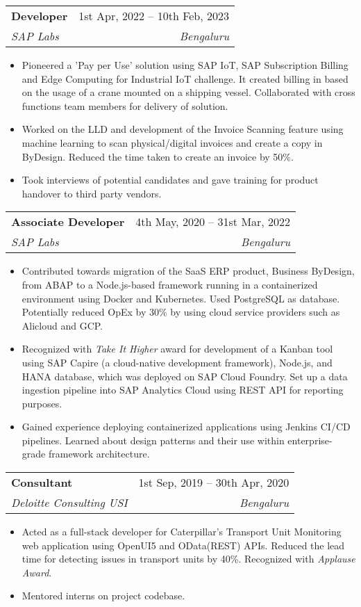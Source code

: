 \documentclass[letterpaper,11pt]{article}
\makeatletter
\newcommand{\resumeItem}[1]{
  \item\small{
    {#1 \vspace{-2pt}}
  }
}
\newcommand{\resumeSubheading}[4]{
  \vspace{-2pt}\item
    \begin{tabular*}{0.97\textwidth}[t]{l@{\extracolsep{\fill}}r}
      \textbf{#1} & #2 \\
      \textit{\small#3} & \textit{\small #4} \\
    \end{tabular*}\vspace{-7pt}
}
\newcommand{\resumeSubSubheading}[2]{
    \item
    \begin{tabular*}{0.97\textwidth}{l@{\extracolsep{\fill}}r}
      \textit{\small#1} & \textit{\small #2} \\
    \end{tabular*}\vspace{-7pt}
}
\newcommand{\resumeSubHeadingListEnd}{\end{itemize}}
\newcommand{\resumeItemListStart}{\begin{itemize}}
\newcommand{\resumeItemListEnd}{\end{itemize}\vspace{-5pt}}
\makeatother
\begin{document}

    \resumeSubheading
      {Developer}{1st Apr, 2022 -- 10th Feb, 2023}
      {SAP Labs}{Bengaluru}
      \resumeItemListStart
        \resumeItem{Pioneered a 'Pay per Use' solution using SAP IoT, SAP Subscription Billing and Edge Computing for Industrial IoT challenge. It created billing in based on the usage of a crane mounted on a shipping vessel. Collaborated with cross functions team members for delivery of solution.}
        \resumeItem{Worked on the LLD and development of the Invoice Scanning feature using machine learning to scan physical/digital invoices and create a copy in ByDesign. Reduced the time taken to create an invoice by 50\%.}
        \resumeItem{Took interviews of potential candidates and gave training for product handover to third party vendors.}
    \resumeItemListEnd

    \resumeSubheading
      {Associate Developer}{4th May, 2020 -- 31st Mar, 2022}
      {SAP Labs}{Bengaluru}
      \resumeItemListStart
        \resumeItem{Contributed towards migration of the SaaS ERP product, Business ByDesign, from ABAP to a Node.js-based framework running in a containerized environment using Docker and Kubernetes. Used PostgreSQL as database. Potentially reduced OpEx by 30\% by using cloud service providers such as Alicloud and GCP.}
        \resumeItem{Recognized with \emph{Take It Higher} award for development of a Kanban tool using SAP Capire (a cloud-native development framework), Node.js, and HANA database, which was deployed on SAP Cloud Foundry. Set up a data ingestion pipeline into SAP Analytics Cloud using REST API for reporting purposes.}
        \resumeItem{Gained experience deploying containerized applications using Jenkins CI/CD pipelines. Learned about design patterns and their use within enterprise-grade framework architecture.}
    \resumeItemListEnd

    \resumeSubheading
      {Consultant}{1st Sep, 2019 -- 30th Apr, 2020}
      {Deloitte Consulting USI}{Bengaluru}
      \resumeItemListStart
        \resumeItem{Acted as a full-stack developer for Caterpillar's Transport Unit Monitoring web application using OpenUI5 and OData(REST) APIs. Reduced the lead time for detecting issues in transport units by 40\%. Recognized with \emph{Applause Award}.}
        \resumeItem{Mentored interns on project codebase. }
    \resumeItemListEnd
\end{document}
